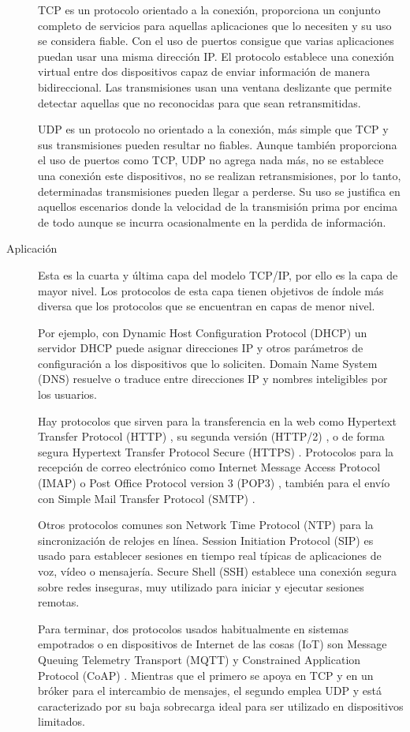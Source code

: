 \begin{description}
  TCP es un protocolo orientado a la conexión, proporciona un conjunto completo
  de servicios para aquellas aplicaciones que lo necesiten y su uso se considera
  fiable. Con el uso de puertos consigue que varias aplicaciones puedan usar una
  misma dirección IP. El protocolo establece una conexión virtual entre dos
  dispositivos capaz de enviar información de manera bidireccional. Las
  transmisiones usan una ventana deslizante que permite detectar aquellas que no
  reconocidas para que sean retransmitidas.

  UDP es un protocolo no orientado a la conexión, más simple que TCP y sus
  transmisiones pueden resultar no fiables. Aunque también proporciona el uso
  de puertos como TCP, UDP no agrega nada más, no se establece una conexión este
  dispositivos, no se realizan retransmisiones, por lo tanto, determinadas
  transmisiones pueden llegar a perderse. Su uso se justifica en aquellos
  escenarios donde la velocidad de la transmisión prima por encima de todo
  aunque se incurra ocasionalmente en la perdida de información.

  \item[Aplicación] Esta es la cuarta y última capa del modelo TCP/IP, por ello 
  es la capa de mayor nivel. Los protocolos de esta capa tienen objetivos de
  índole más diversa que los protocolos que se encuentran en capas de menor
  nivel.

  Por ejemplo, con Dynamic Host Configuration Protocol (DHCP) \cite{rfc2131}
  un servidor DHCP puede asignar direcciones IP y otros parámetros de
  configuración a los dispositivos que lo soliciten. Domain Name System (DNS)
  \cite{rfc1034} \cite{rfc1035} resuelve o traduce entre direcciones IP y
  nombres inteligibles por los usuarios.

  Hay protocolos que sirven para la transferencia en la web como Hypertext
  Transfer Protocol (HTTP) \cite{rfc7230}, su segunda versión (HTTP/2)
  \cite{rfc7540}, o de forma segura Hypertext Transfer Protocol Secure (HTTPS) 
  \cite{rfc2818}. Protocolos para la recepción de correo electrónico como
  Internet Message Access Protocol (IMAP) \cite{rfc3501} o Post Office
  Protocol version 3 (POP3) \cite{rfc1939}, también para el envío con
  Simple Mail Transfer Protocol (SMTP) \cite{rfc5321}.

  Otros protocolos comunes son Network Time Protocol (NTP) \cite{rfc5905}
  para la sincronización de relojes en línea. Session Initiation Protocol
  (SIP) \cite{rfc3261} es usado para establecer sesiones en tiempo real típicas
  de aplicaciones de voz, vídeo o mensajería. Secure Shell (SSH) \cite{rfc4253}
  establece una conexión segura sobre redes inseguras, muy utilizado para
  iniciar y ejecutar sesiones remotas.

  Para terminar, dos protocolos usados habitualmente en sistemas empotrados o
  en dispositivos de Internet de las cosas (IoT) son Message Queuing Telemetry 
  Transport (MQTT) \cite{banks2015} y Constrained Application Protocol (CoAP)
  \cite{rfc7252}. Mientras que el primero se apoya en TCP y en un bróker para
  el intercambio de mensajes, el segundo emplea UDP y está caracterizado por su
  baja sobrecarga ideal para ser utilizado en dispositivos limitados.
\end{description}
